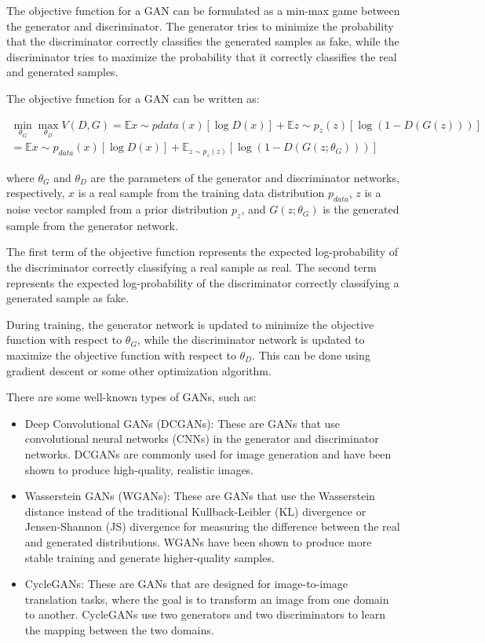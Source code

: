 The objective function for a GAN can be formulated as a min-max game between the generator and discriminator. The generator tries to minimize the probability that the discriminator correctly classifies the generated samples as fake, while the discriminator tries to maximize the probability that it correctly classifies the real and generated samples.

The objective function for a GAN can be written as:

\begin{equation}
\begin{split}
	\min_{\theta_G}\max_{\theta_D} V(D, G) = \mathbb{E}{x\sim p{data}(x)}[\log D(x)] + \mathbb{E}{z\sim p_z(z)}[\log(1-D(G(z)))] \\
	= \mathbb{E}{x\sim p_{data}(x)}[\log D(x)] + \mathbb{E}_{z\sim p_z(z)}[\log(1-D(G(z;\theta_G)))]
\end{split}
\end{equation}

where $\theta_G$ and $\theta_D$ are the parameters of the generator and discriminator networks, respectively, $x$ is a real sample from the training data distribution $p_{data}$, $z$ is a noise vector sampled from a prior distribution $p_z$, and $G(z;\theta_G)$ is the generated sample from the generator network.

The first term of the objective function represents the expected log-probability of the discriminator correctly classifying a real sample as real. The second term represents the expected log-probability of the discriminator correctly classifying a generated sample as fake.

During training, the generator network is updated to minimize the objective function with respect to $\theta_G$, while the discriminator network is updated to maximize the objective function with respect to $\theta_D$. This can be done using gradient descent or some other optimization algorithm.

There are some well-known types of GANs, such as:

\begin{itemize}
	\item Deep Convolutional GANs (DCGANs): These are GANs that use convolutional neural networks (CNNs) in the generator and discriminator networks. DCGANs are commonly used for image generation and have been shown to produce high-quality, realistic images.
	\item Wasserstein GANs (WGANs): These are GANs that use the Wasserstein distance instead of the traditional Kullback-Leibler (KL) divergence or Jensen-Shannon (JS) divergence for measuring the difference between the real and generated distributions. WGANs have been shown to produce more stable training and generate higher-quality samples.
	\item CycleGANs: These are GANs that are designed for image-to-image translation tasks, where the goal is to transform an image from one domain to another. CycleGANs use two generators and two discriminators to learn the mapping between the two domains.
\end{itemize}

